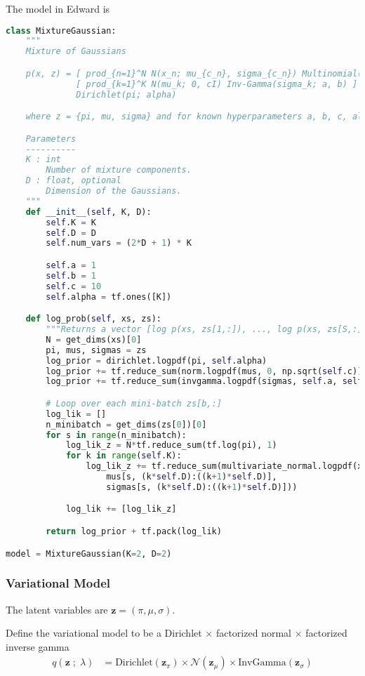 The model in Edward is 
\begin{lstlisting}[language=Python]
class MixtureGaussian:
    """
    Mixture of Gaussians

    p(x, z) = [ prod_{n=1}^N N(x_n; mu_{c_n}, sigma_{c_n}) Multinomial(c_n; pi) ]
              [ prod_{k=1}^K N(mu_k; 0, cI) Inv-Gamma(sigma_k; a, b) ]
              Dirichlet(pi; alpha)

    where z = {pi, mu, sigma} and for known hyperparameters a, b, c, alpha.

    Parameters
    ----------
    K : int
        Number of mixture components.
    D : float, optional
        Dimension of the Gaussians.
    """
    def __init__(self, K, D):
        self.K = K
        self.D = D
        self.num_vars = (2*D + 1) * K

        self.a = 1
        self.b = 1
        self.c = 10
        self.alpha = tf.ones([K])

    def log_prob(self, xs, zs):
        """Returns a vector [log p(xs, zs[1,:]), ..., log p(xs, zs[S,:])]."""
        N = get_dims(xs)[0]
        pi, mus, sigmas = zs
        log_prior = dirichlet.logpdf(pi, self.alpha)
        log_prior += tf.reduce_sum(norm.logpdf(mus, 0, np.sqrt(self.c)), 1)
        log_prior += tf.reduce_sum(invgamma.logpdf(sigmas, self.a, self.b), 1)

        # Loop over each mini-batch zs[b,:]
        log_lik = []
        n_minibatch = get_dims(zs[0])[0]
        for s in range(n_minibatch):
            log_lik_z = N*tf.reduce_sum(tf.log(pi), 1)
            for k in range(self.K):
                log_lik_z += tf.reduce_sum(multivariate_normal.logpdf(xs,
                    mus[s, (k*self.D):((k+1)*self.D)],
                    sigmas[s, (k*self.D):((k+1)*self.D)]))

            log_lik += [log_lik_z]

        return log_prior + tf.pack(log_lik)

model = MixtureGaussian(K=2, D=2)
\end{lstlisting}


\subsubsection{Variational Model}
The latent variables are $\mathbf{z} = (\pi, \mu, \sigma)$.

Define the variational model to be a Dirichlet $\times$ factorized normal
$\times$ factorized inverse gamma
\begin{align*}
  q(\mathbf{z} \;;\; \lambda) 
  &=
  \text{Dirichlet}(\mathbf{z}_\pi) 
  \times
  \mathcal{N}(\mathbf{z}_\mu)
  \times
  \text{InvGamma}(\mathbf{z}_\sigma)
\end{align*}

